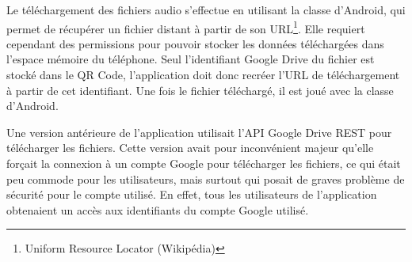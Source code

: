 \par
Le téléchargement des fichiers audio s'effectue en utilisant la classe  d'Android, qui permet de récupérer un fichier distant à partir de son URL\footnote{Uniform Resource Locator (Wikipédia)}. Elle requiert cependant des permissions pour pouvoir stocker les données téléchargées dans l'espace mémoire du téléphone. Seul l'identifiant Google Drive du fichier est stocké dans le QR Code, l'application doit donc recréer l'URL de téléchargement	à partir de cet identifiant. Une fois le fichier téléchargé, il est joué avec la classe  d'Android.\\

\par
Une version antérieure de l'application utilisait l'API Google Drive REST pour télécharger les fichiers. Cette version avait pour inconvénient majeur qu'elle forçait la connexion à un compte Google pour télécharger les fichiers, ce qui était peu commode pour les utilisateurs, mais surtout qui posait de graves problème de sécurité pour le compte utilisé. En effet, tous les utilisateurs de l'application obtenaient un accès aux identifiants du compte Google utilisé.